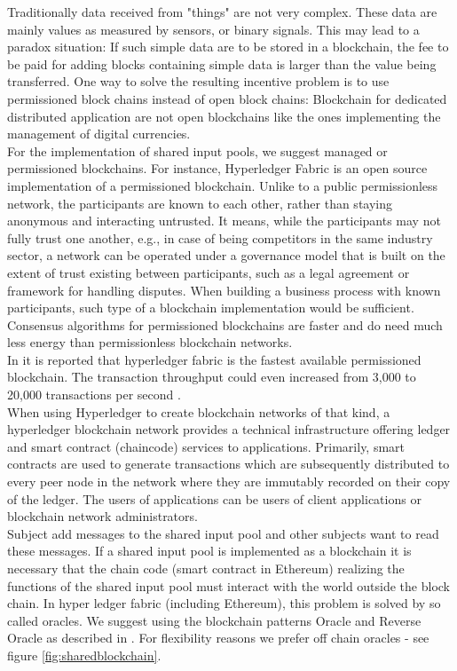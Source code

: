 Traditionally data received from "things" are not very complex. These data are mainly values as measured by sensors, or binary signals. This may lead to a paradox situation: If such simple data are to be stored in a blockchain, the fee to be paid for adding blocks containing simple data is larger than the value being transferred. 
One way to solve the resulting incentive problem is to use permissioned block chains instead of open block chains: Blockchain for dedicated distributed application are not open blockchains like the ones implementing the management of digital currencies. 
\\
For the implementation of shared input pools, we suggest managed or permissioned blockchains. For instance, Hyperledger Fabric \cite{article:hyperledger} is an open source implementation of a permissioned blockchain. Unlike to a public permissionless network, the participants are known to each other, rather than staying anonymous and interacting untrusted. It means, while the participants may not fully trust one another, e.g., in case of being competitors in the same industry sector, a network can be operated under a governance model that is built on the extent of trust existing between participants, such as a legal agreement or framework for handling disputes. When building a business process with known participants, such type of a blockchain implementation would be sufficient. Consensus algorithms for permissioned blockchains are faster and do need much less energy than permissionless blockchain networks. 
\\
In \cite{article:Blockbench} it is reported that hyperledger fabric is the fastest available permissioned blockchain. The transaction throughput could even increased from 3,000 to 20,000 transactions per second \cite{article:hyperledgerfabric}.
\\
When using Hyperledger to create blockchain networks of that kind, a hyperledger blockchain network provides a technical infrastructure offering ledger and smart contract (chaincode) services to applications. Primarily, smart contracts are used to generate transactions which are subsequently distributed to every peer node in the network where they are immutably recorded on their copy of the ledger. The users of applications can be users of client applications or blockchain network administrators.
\\
Subject add messages to the shared input pool and other subjects want to read these messages. If a shared input pool is implemented as a blockchain it is necessary that the chain code (smart contract in Ethereum) realizing the functions of the shared input pool must interact with the world outside the block chain. In hyper ledger fabric (including Ethereum), this problem is solved by so called oracles. We suggest using the blockchain patterns Oracle and Reverse Oracle as described in \cite{book:Blockchainapplications}. For flexibility reasons we prefer off chain oracles - see figure \ref{fig:sharedblockchain}.



